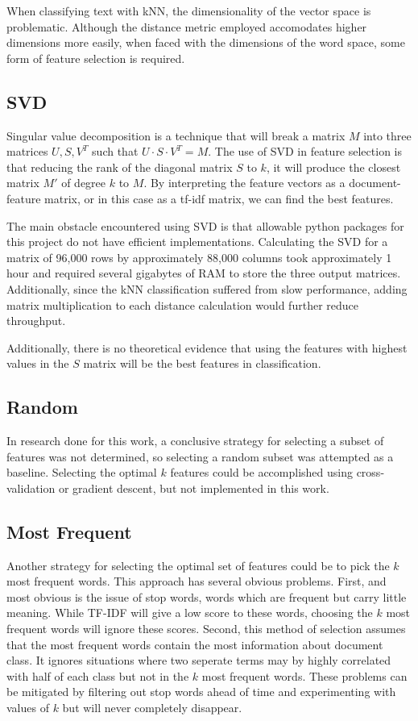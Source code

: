 \documentclass[10pt,twocolumn]{article}
\begin{document}
When classifying text with kNN, the dimensionality of the vector space is problematic. Although the distance metric employed accomodates higher dimensions more easily, when faced with the dimensions of the word space, some form of feature selection is required.

\subsection*{SVD}

Singular value decomposition is a technique that will break a matrix $M$ into three matrices $U, S, V^T$ such that $U \cdot S \cdot V^T = M$. The use of SVD in feature selection is that reducing the rank of the diagonal matrix $S$ to $k$, it will produce the closest matrix $M'$ of degree $k$ to $M$. By interpreting the feature vectors as a document-feature matrix, or in this case as a tf-idf matrix, we can find the best features. 

The main obstacle encountered using SVD is that allowable python packages for this project do not have efficient implementations. Calculating the SVD for a matrix of 96,000 rows by approximately 88,000 columns took approximately 1 hour and required several gigabytes of RAM to store the three output matrices. Additionally, since the kNN classification suffered from slow performance, adding matrix multiplication to each distance calculation would further reduce throughput.

Additionally, there is no theoretical evidence that using the features with highest values in the $S$ matrix will be the best features in classification.

\subsection*{Random}

In research done for this work, a conclusive strategy for selecting a subset of features was not determined, so selecting a random subset was attempted as a baseline.  Selecting the optimal $k$ features could be accomplished using cross-validation or gradient descent, but not implemented in this work.

\subsection*{Most Frequent}

Another strategy for selecting the optimal set of features could be to pick the $k$ most frequent words. This approach has several obvious problems. First, and most obvious is the issue of stop words, words which are frequent but carry little meaning. While TF-IDF will give a low score to these words, choosing the $k$ most frequent words will ignore these scores. Second, this method of selection assumes that the most frequent words contain the most information about document class. It ignores situations where two seperate terms may by highly correlated with half of each class but not in the $k$ most frequent words. These problems can be mitigated by filtering out stop words ahead of time and experimenting with values of $k$ but will never completely disappear.
\end{document}
